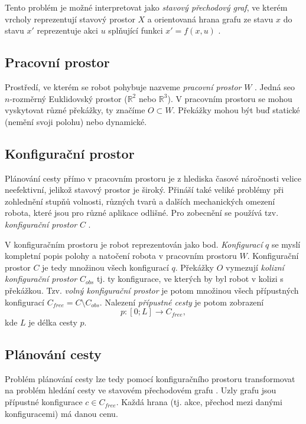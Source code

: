Tento problém je možné interpretovat jako \emph{stavový přechodový graf}, ve kterém vrcholy reprezentují stavový prostor $X$ a orientovaná hrana grafu ze stavu $x$ do stavu $x'$ reprezentuje akci $u$ splňující funkci $x'=f(x,u)$ \cite{LaValle2006}. 

\subsection{Pracovní prostor}
Prostředí, ve kterém se robot pohybuje nazveme \emph{pracovní prostor} $W$  \cite{Koubaa20180406}. Jedná se\linebreak o~$n$-rozměrný Euklidovský prostor ($\mathbb{R}^2$ nebo $\mathbb{R}^3$). V pracovním prostoru se mohou vyskytovat různé překážky, ty značíme $O\subset W$. Překážky mohou být buď statické (nemění svoji polohu) nebo dynamické.


\subsection{Konfigurační prostor}
Plánování cesty přímo v pracovním prostoru je z hlediska časové náročnosti velice neefektivní, jelikož stavový prostor je široký. Přináší také veliké problémy při zohlednění stupňů volnosti, různých tvarů a dalších mechanických omezení robota, které jsou pro různé aplikace odlišné. Pro zobecnění se používá tzv. \emph{konfigurační prostor} $C$ \cite{Koubaa20180406,Parker2009}.

V konfiguračním prostoru je robot reprezentován jako bod. \emph{Konfigurací} $q$ se myslí kompletní popis polohy a natočení robota v pracovním prostoru $W$. Konfigurační prostor $C$ je tedy množinou všech konfigurací $q$. Překážky $O$ vymezují \emph{kolizní konfigurační prostor} $C_{obs}$ tj. ty konfigurace, ve kterých by byl robot v kolizi s překážkou. Tzv. \emph{volný konfigurační prostor} je potom množinou všech přípustných konfigurací $C_{free}=C \setminus C_{obs}$. Nalezení \emph{přípustné cesty} je potom zobrazení
\begin{equation}
p: \left[0;L\right]\to C_{free},
\end{equation}
kde $L$ je délka cesty $p$.

\subsection{Plánování cesty}

Problém plánování cesty lze tedy pomocí konfiguračního prostoru transformovat na problém hledání cesty ve stavovém přechodovém grafu \cite{Ferguson2005}. Uzly grafu jsou přípustné konfigurace $c\in C_{free}$. Každá hrana (tj. akce, přechod mezi danými konfiguracemi) má danou cenu.

